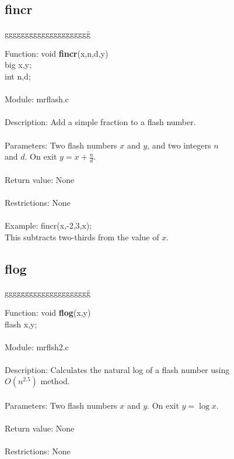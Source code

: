 \subsection{fincr}

\begin{tabbing}
ggggggggggggggggggggg\= \kill

      Function:      \>void {\bf fincr}(x,n,d,y) \\
                     \>big x,y; \\
                     \>int n,d; \\
      \ \\
      Module:        \>mrflash.c \\
      \ \\
      Description:   \>Add a simple fraction to a flash number. \\
      \ \\
      Parameters:    \>Two flash numbers $x$ and $y$, and two integers $n$  \\
                     \>and $d$. On exit $y=x+\frac{n}{d}$. \\
      \ \\
      Return value:  \>None \\
      \ \\
      Restrictions:  \>None \\
      \ \\
      Example:       \>fincr(x,-2,3,x); \\
                     \>This subtracts two-thirds from the value of $x$. \\

\end{tabbing}

\subsection{flog}

\begin{tabbing}
ggggggggggggggggggggg\= \kill

      Function:      \>void {\bf flog}(x,y) \\
                     \>flash x,y; \\
      \ \\
      Module:        \>mrflsh2.c \\
      \ \\
      Description:   \>Calculates the natural log of a flash number using \\
                     \>$O(n^{2.5})$ method. \\
      \ \\
      Parameters:    \>Two flash numbers $x$ and $y$. On exit $y=\log x$. \\
      \ \\
      Return value:  \>None \\
      \ \\
      Restrictions:  \>None \\

\end{tabbing}
\pagebreak
